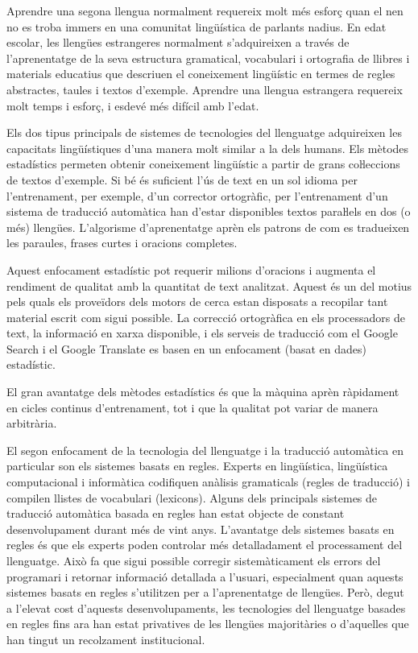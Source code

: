 \begin{multicols}{2}
Aprendre una segona llengua normalment requereix molt més esforç quan el nen no es troba immers en una comunitat lingüística de parlants nadius. En edat escolar, les llengües estrangeres normalment s’adquireixen a través de l’aprenentatge de la seva estructura gramatical, vocabulari i ortografia de llibres i materials educatius que descriuen el coneixement lingüístic en termes de regles abstractes, taules i textos d’exemple. Aprendre una llengua estrangera requereix molt temps i esforç, i esdevé més difícil amb l’edat.


Els dos tipus principals de sistemes de tecnologies del llenguatge adquireixen les capacitats lingüístiques d’una manera molt similar a la dels humans. Els mètodes estadístics permeten obtenir coneixement lingüístic a partir de grans coŀleccions de textos d’exemple. Si bé és suficient l'ús de text en un sol idioma per l’entrenament, per exemple, d'un corrector ortogràfic, per l’entrenament d'un sistema de traducció automàtica han d'estar disponibles textos paraŀlels en dos (o més) llengües. L'algorisme d'aprenentatge aprèn els patrons de com es tradueixen les paraules, frases curtes i oracions completes.

Aquest enfocament estadístic pot requerir milions d'oracions i augmenta el rendiment de qualitat amb la quantitat de text analitzat. Aquest és un del motius pels quals els proveïdors dels motors de cerca estan disposats a recopilar tant material escrit com sigui possible. La correcció ortogràfica en els processadors de text, la informació en xarxa disponible, i els serveis de traducció com el Google Search i el Google Translate es basen en un enfocament (basat en dades) estadístic.   

El gran avantatge dels mètodes estadístics és que la màquina aprèn ràpidament en cicles continus d’entrenament, tot i que la qualitat pot variar de manera arbitrària.

El segon enfocament de la tecnologia del llenguatge i la traducció automàtica en particular son els sistemes basats en regles. Experts en lingüística, lingüística computacional i informàtica codifiquen anàlisis gramaticals (regles de traducció) i compilen llistes de vocabulari (lexicons). Alguns dels principals sistemes de traducció automàtica basada en regles han estat objecte de constant desenvolupament durant més de vint anys. L’avantatge dels sistemes basats en regles és que els experts poden controlar més detalladament el processament del llenguatge. Això fa que sigui possible corregir sistemàticament els errors del programari i retornar informació detallada a l’usuari, especialment quan aquests sistemes basats en regles s’utilitzen per a l’aprenentatge de llengües. Però, degut a l'elevat cost d'aquests desenvolupaments, les tecnologies del llenguatge basades en regles fins ara han estat privatives de les llengües majoritàries o d'aquelles que han tingut un recolzament institucional.


\end{multicols}
